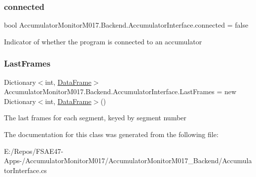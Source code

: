 \subsubsection{\texorpdfstring{connected}{connected}}
{\footnotesize\ttfamily bool Accumulator\+Monitor\+M017.\+Backend.\+Accumulator\+Interface.\+connected = false}



Indicator of whether the program is connected to an accumulator 

\mbox{\label{class_accumulator_monitor_m017_1_1_backend_1_1_accumulator_interface_a3a410de91112d620ab24f86795aaea60}} 
\subsubsection{\texorpdfstring{Last\+Frames}{LastFrames}}
{\footnotesize\ttfamily Dictionary$<$int, \hyperlink{class_accumulator_monitor_m017_1_1_backend_1_1_data_frame}{Data\+Frame}$>$ Accumulator\+Monitor\+M017.\+Backend.\+Accumulator\+Interface.\+Last\+Frames = new Dictionary$<$int, \hyperlink{class_accumulator_monitor_m017_1_1_backend_1_1_data_frame}{Data\+Frame}$>$()}



The last frames for each segment, keyed by segment number 



The documentation for this class was generated from the following file\+:\begin{DoxyCompactItemize}
\item 
E\+:/\+Repos/\+F\+S\+A\+E47-\/\+Apps-\//\+Accumulator\+Monitor\+M017/\+Accumulator\+Monitor\+M017\+\_\+\+Backend/Accumulator\+Interface.\+cs\end{DoxyCompactItemize}
